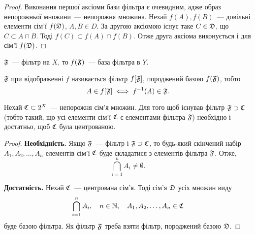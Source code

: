 \begin{proof}
    Виконання першої аксіоми бази фільтра є очевидним, адже образ непорожньої множини~--- непорожня множина. Нехай $f(A), f(B)$~--- довільні елементи сім'ї $f(\frak D)$, $A, B \in D$. За другою аксіомою існує таке $C \in \frak D$, що $C \subset A \cap B$. Тоді $f(C) \subset f(A) \cap f(B)$. Отже друга аксіома виконується і для сім'ї $f(\frak D)$.
\end{proof}

\begin{corollary}
    \label{th:filter-image-filterbase}
    $\frak F$~--- фільтр на $X$, то $f(\frak F)$~--- база фільтра в $Y$.
\end{corollary}

\begin{definition}
     $\frak F$ при відображенні $f$ називається фільтр $f[\frak F]$, породжений базою $f(\frak F)$, тобто
    \begin{equation*}
        A \in f[\frak F] \iff f\inv (A) \in \frak F.
    \end{equation*}
\end{definition}

\begin{theorem}
    \label{th:supset-finite-intersection-property}
    Нехай $\frak C \subset 2^X$~--- непорожня сім'я множин. Для того щоб існував фільтр $\frak F \supset \frak C$ (тобто такий, що усі елементи сім'ї $\frak C$ є елементами фільтра $\frak F$) необхідно і достатньо, щоб $\frak C$ була центрованою.
\end{theorem}

\begin{proof}
    \textbf{Необхідність.} Якщо $\frak F$~--- фільтр і $\frak F \supset \frak C$, то будь-який скінчений набір $A_1, A_2, \dots, A_n$ елементів сім'ї $\frak C$ буде складатися з елементів фільтра $\frak F$. Отже, 
    \begin{equation*}
        \bigcap_{i = 1}^n A_i \ne \emptyset.
    \end{equation*}

    \textbf{Достатність.} Нехай $\frak C$~--- центрована сім'я. Тоді сім'я $\frak D$ усіх множин виду
    \begin{equation*}
        \bigcap_{i = 1}^n A_i, \quad n \in \NN, \quad A_1, A_2, \dots, A_n \in \frak C
    \end{equation*}
    буде базою фільтра. Як фільтр $\frak F$ треба взяти фільтр, породжений базою $\frak D$.
\end{proof}

